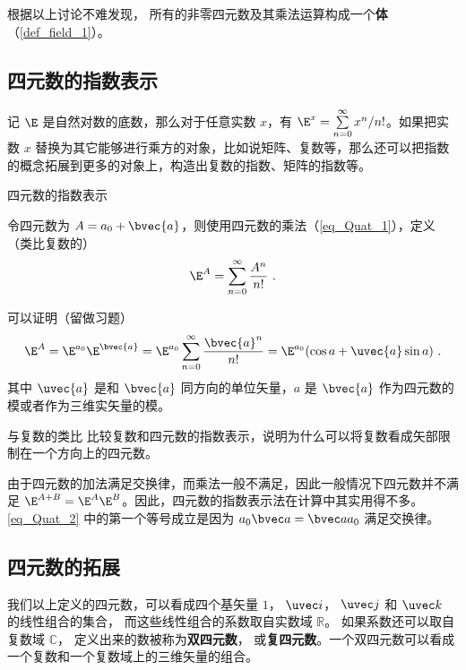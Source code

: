 根据以上讨论不难发现， 所有的非零四元数及其乘法运算构成一个\textbf{体}（\autoref{def_field_1}）。





\subsection{四元数的指数表示}

记 $\E$ 是自然对数的底数，那么对于任意实数 $x$，有 $\E^x = \sum^\infty\limits_{n=0} x^n / n!$。如果把实数 $x$ 替换为其它能够进行乘方的对象，比如说矩阵、复数等，那么还可以把指数的概念拓展到更多的对象上，构造出复数的指数、矩阵的指数等。

\begin{definition}{四元数的指数表示}

令四元数为 $A=a_0+\bvec{a}$，则使用四元数的乘法（\autoref{eq_Quat_1}），定义（类比复数的）
\begin{equation}\label{eq_Quat_2}
\E^A = \sum^\infty\limits_{n=0}\frac{A^n}{n!}~. 
\end{equation}
\end{definition}
可以证明（留做习题）
\begin{equation}
\E^A = \E^{a_0}\E^{\bvec{a}}=\E^{a_0}\sum^\infty\limits_{n=0}\frac{\bvec{a}^n}{n!}=\E^{a_0}(\cos{a}+ \uvec{a}\sin a)~.
\end{equation}
其中 $\uvec{a}$ 是和 $\bvec{a}$ 同方向的单位矢量，$a$ 是 $\bvec{a}$ 作为四元数的模或者作为三维实矢量的模。

\begin{exercise}{与复数的类比}
比较复数和四元数的指数表示，说明为什么可以将复数看成矢部限制在一个方向上的四元数。
\end{exercise}

由于四元数的加法满足交换律，而乘法一般不满足，因此一般情况下四元数并不满足 $\E^{A+B} = \E^A \E^B$。因此，四元数的指数表示法在计算中其实用得不多。 \autoref{eq_Quat_2} 中的第一个等号成立是因为 $a_0\bvec a = \bvec a a_0$ 满足交换律。

\subsection{四元数的拓展}

我们以上定义的四元数，可以看成四个基矢量 $1$， $\uvec i$， $\uvec j$ 和 $\uvec k$ 的线性组合的集合， 而这些线性组合的系数取自实数域 $\mathbb R$。 如果系数还可以取自复数域 $\mathbb C$， 定义出来的数被称为\textbf{双四元数}， 或\textbf{复四元数}。一个双四元数可以看成一个复数和一个复数域上的三维矢量的组合。

